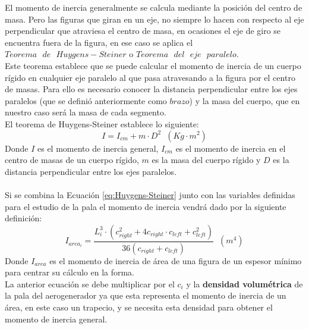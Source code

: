 El momento de inercia generalmente se calcula mediante la posición del centro de masa. Pero las figuras que giran en un eje, no siempre lo hacen con respecto al eje perpendicular que atraviesa el centro de masa, en ocasiones el eje de giro se encuentra fuera de la figura, en ese caso se aplica el $Teorema \text{ } de \text{ } Huygens-Steiner$ o $Teorema \text{ } del \text{ } eje \text{ } paralelo$. \\

Este teorema establece que se puede calcular el momento de inercia de un cuerpo rígido en cualquier eje paralelo al que pasa atravesando a la figura por el centro de masas. Para ello es necesario conocer la distancia perpendicular entre los ejes paralelos (que se definió anteriormente como $brazo$) y la masa del cuerpo, que en nuestro caso será la masa de cada segmento. \\

El teorema de Huygens-Steiner establece lo siguiente:
 \begin{equation}
    I = I_{cm} + m \cdot D^2 \hspace{7pt} (Kg \cdot m^2)
 \label{eq:Huygens-Steiner}
 \end{equation}
 Donde $I$ es el momento de inercia general, $I_{cm}$ es el momento de inercia en el centro de masas de un cuerpo rígido, $m$ es la masa del cuerpo rígido y $D$ es la distancia perpendicular entre los ejes paralelos.\\\\
 

Si se combina la Ecuación \ref{eq:Huygens-Steiner} junto con las variables definidas para el estudio de la pala el momento de inercia vendrá dado por la siguiente definición:
 \begin{equation}
  I_{area_i} = \dfrac{ L_{i}^3 \cdot (c_{right}^2 + 4 c_{right} \cdot c_{left} + c_{left}^2)}{ 36 (c_{right} + c_{left})} \hspace{7pt} (m^4)
 \label{def:momento_inercia_area}
 \end{equation}
 Donde $I_{area}$ es el momento de inercia de área de una figura de un espesor mínimo para centrar su cálculo en la forma.\\
 
 La anterior ecuación se debe multiplicar por el \textbf{$c_i$} y la \textbf{densidad volumétrica} de la pala del aerogenerador ya que esta representa el momento de inercia de un área, en este caso un trapecio, y se necesita esta densidad para obtener el momento de inercia general.\\

